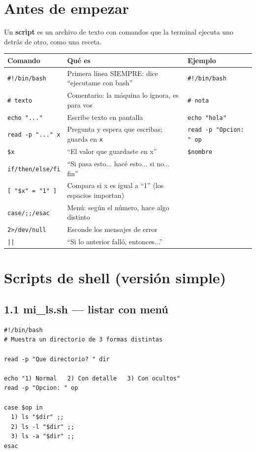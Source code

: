 \section*{Antes de empezar}

Un \textbf{script} es un archivo de texto con comandos que la terminal ejecuta uno detrás de otro, como una receta.

\begin{center}
\begin{tabularx}{\textwidth}{llX}
  \toprule
  \textbf{Comando} & \textbf{Qué es} & \textbf{Ejemplo} \\
  \midrule
  \texttt{\#!/bin/bash} & Primera línea SIEMPRE: dice ``ejecutame con bash'' & \texttt{\#!/bin/bash} \\
  \texttt{\# texto} & Comentario: la máquina lo ignora, es para vos & \texttt{\# nota} \\
  \texttt{echo "..."} & Escribe texto en pantalla & \texttt{echo "hola"} \\
  \texttt{read -p "..." x} & Pregunta y espera que escribas; guarda en \texttt{x} & \texttt{read -p "Opcion: " op} \\
  \texttt{\$x} & ``El valor que guardaste en x'' & \texttt{\$nombre} \\
  \texttt{if/then/else/fi} & ``Si pasa esto... hacé esto... si no... fin'' & \\
  \texttt{[ "\$x" = "1" ]} & Compara si x es igual a ``1'' (los espacios importan) & \\
  \texttt{case/;;/esac} & Menú: según el número, hace algo distinto & \\
  \texttt{2>/dev/null} & Esconde los mensajes de error & \\
  \texttt{||} & ``Si lo anterior falló, entonces...'' & \\
  \bottomrule
\end{tabularx}
\end{center}

\section{Scripts de shell (versión simple)}

\subsection{1.1 mi\_ls.sh --- listar con menú}

\begin{lstlisting}
#!/bin/bash
# Muestra un directorio de 3 formas distintas

read -p "Que directorio? " dir

echo "1) Normal   2) Con detalle   3) Con ocultos"
read -p "Opcion: " op

case $op in
  1) ls "$dir" ;;
  2) ls -l "$dir" ;;
  3) ls -a "$dir" ;;
esac
\end{lstlisting}

